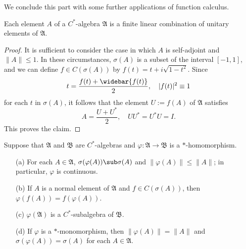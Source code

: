 We conclude this part with some further applications of function calculus.
\begin{proposition}\label{C^* algebra unitary generated}
Each element $A$ of a $C^*$-algebra $\mathfrak{A}$ is a finite linear combination of unitary elements of $\mathfrak{A}$.
\end{proposition}
\begin{proof}
It is sufficient to consider the case in which $A$ is self-adjoint and $\|A\|\leq 1$. In these circumstances, $\sigma(A)$ is a subset of the interval $[-1,1]$, and we can define $f\in C(\sigma(A))$ by $f(t)=t+i\sqrt{1-t^2}$. Since
\[t=\frac{f(t)+\widebar{f(t)}}{2},\quad |f(t)|^2\equiv 1\]
for each $t$ in $\sigma(A)$, it follows that the element $U:=f(A)$ of $\mathfrak{A}$ satisfies
\[A=\frac{U+U^*}{2},\quad UU^*=U^*U=I.\]
This proves the claim.
\end{proof}
\begin{proposition}\label{C^* algebra homomorphism prop}
Suppose that $\mathfrak{A}$ and $\mathfrak{B}$ are $C^*$-algebras and $\varphi:\mathfrak{A}\to\mathfrak{B}$ is a $*$-homomorphism.
\begin{itemize}
\item[(a)] For each $A\in\mathfrak{A}$, $\sigma(\varphi(A))\sub\sigma(A)$ and $\|\varphi(A)\|\leq\|A\|$; in particular, $\varphi$ is continuous.
\item[(b)] If $A$ is a normal element of $\mathfrak{A}$ and $f\in C(\sigma(A))$, then $\varphi(f(A))=f(\varphi(A))$.
\item[(c)] $\varphi(\mathfrak{A})$ is a $C^*$-subalgebra of $\mathfrak{B}$.
\item[(d)] If $\varphi$ is a $*$-monomorphism, then $\|\varphi(A)\|=\|A\|$ and $\sigma(\varphi(A))=\sigma(A)$ for each $A\in\mathfrak{A}$.
\end{itemize}
\end{proposition}
